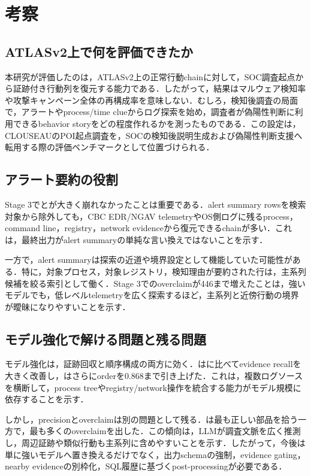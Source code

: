 ﻿

\section{考察}

\subsection{ATLASv2上で何を評価できたか}

本研究が評価したのは，ATLASv2上の正常行動chainに対して，SOC調査起点から証跡付き行動列を復元する能力である．したがって，結果はマルウェア検知率や攻撃キャンペーン全体の再構成率を意味しない．むしろ，検知後調査の局面で，アラートやprocess/time clueからログ探索を始め，調査者が偽陽性判断に利用できるbehavior storyをどの程度作れるかを測ったものである．この設定は，CLOUSEAUのPOI起点調査を，SOCの検知後説明生成および偽陽性判断支援へ転用する際の評価ベンチマークとして位置づけられる．

\subsection{アラート要約の役割}

Stage 3でとが大きく崩れなかったことは重要である．alert summary rowsを検索対象から除外しても，CBC EDR/NGAV telemetryやOS側ログに残るprocess，command line，registry，network evidenceから復元できるchainが多い．これは，最終出力がalert summaryの単純な言い換えではないことを示す．

一方で，alert summaryは探索の近道や境界設定として機能していた可能性がある．特に，対象プロセス，対象レジストリ，検知理由が要約された行は，主系列候補を絞る索引として働く．Stage 3でのoverclaimが446まで増えたことは，強いモデルでも，低レベルtelemetryを広く探索するほど，主系列と近傍行動の境界が曖昧になりやすいことを示す．

\subsection{モデル強化で解ける問題と残る問題}

モデル強化は，証跡回収と順序構成の両方に効く．はに比べてevidence recallを大きく改善し，はさらにorderを0.868まで引き上げた．これは，複数ログソースを横断して，process treeやregistry/network操作を統合する能力がモデル規模に依存することを示す．

しかし，precisionとoverclaimは別の問題として残る．は最も正しい部品を拾う一方で，最も多くのoverclaimを出した．この傾向は，LLMが調査文脈を広く推測し，周辺証跡や類似行動も主系列に含めやすいことを示す．したがって，今後は単に強いモデルへ置き換えるだけでなく，出力schemaの強制，evidence gating，nearby evidenceの別枠化，SQL履歴に基づくpost-processingが必要である．

